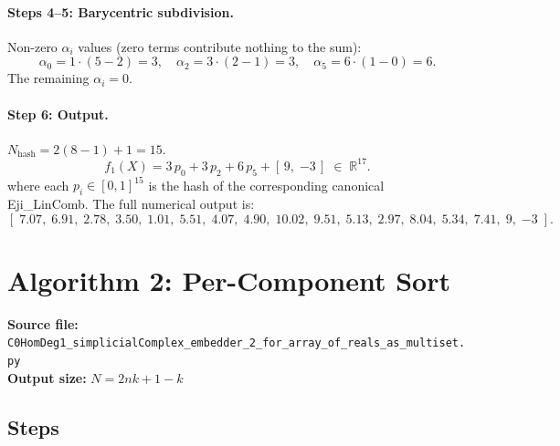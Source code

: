 \documentclass[11pt,a4paper]{article}
\newcommand{\R}{\mathbb{R}}
\begin{document}
\paragraph{Steps 4–5: Barycentric subdivision.}
Non-zero $\alpha_i$ values (zero terms contribute nothing to the sum):
\[
  \alpha_0 = 1\cdot(5-2) = 3, \quad
  \alpha_2 = 3\cdot(2-1) = 3, \quad
  \alpha_5 = 6\cdot(1-0) = 6.
\]
The remaining $\alpha_i = 0$.

\paragraph{Step 6: Output.}
$N_{\text{hash}} = 2(8-1)+1 = 15$.
\[
  f_1(X) = 3\,p_0 + 3\,p_2 + 6\,p_5 + [\,9,\; {-3}\,] \;\in\; \R^{17}.
\]
where each $p_i \in [0,1]^{15}$ is the hash of the corresponding canonical
Eji\_LinComb.  The full numerical output is:
\[
  [\;7.07,\; 6.91,\; 2.78,\; 3.50,\; 1.01,\; 5.51,\; 4.07,\; 4.90,\; 10.02,\;
   9.51,\; 5.13,\; 2.97,\; 8.04,\; 5.34,\; 7.41,\; 9,\; {-3}\;].
\]


\section{Algorithm 2: Per-Component Sort}
\label{sec:alg2}

\textcolor{alg2}{\textbf{Source file:}}
\texttt{C0HomDeg1\_simplicialComplex\_embedder\_2\_for\_array\_of\_reals\_as\_multiset.py}\\
\textbf{Output size:} $N = 2nk + 1 - k$

\subsection*{Steps}
\end{document}
